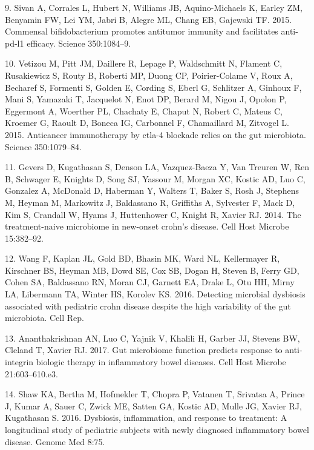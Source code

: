 \documentclass[11pt,]{article}
\begin{document}
\hypertarget{ref-Sivan_cancer_2015}{}
9. Sivan A, Corrales L, Hubert N, Williams JB, Aquino-Michaels K, Earley
ZM, Benyamin FW, Lei YM, Jabri B, Alegre ML, Chang EB, Gajewski TF.
2015. Commensal bifidobacterium promotes antitumor immunity and
facilitates anti-pd-l1 efficacy. Science 350:1084--9.

\hypertarget{ref-Vetizou_cancer_2015}{}
10. Vetizou M, Pitt JM, Daillere R, Lepage P, Waldschmitt N, Flament C,
Rusakiewicz S, Routy B, Roberti MP, Duong CP, Poirier-Colame V, Roux A,
Becharef S, Formenti S, Golden E, Cording S, Eberl G, Schlitzer A,
Ginhoux F, Mani S, Yamazaki T, Jacquelot N, Enot DP, Berard M, Nigou J,
Opolon P, Eggermont A, Woerther PL, Chachaty E, Chaput N, Robert C,
Mateus C, Kroemer G, Raoult D, Boneca IG, Carbonnel F, Chamaillard M,
Zitvogel L. 2015. Anticancer immunotherapy by ctla-4 blockade relies on
the gut microbiota. Science 350:1079--84.

\hypertarget{ref-gevers_pedsCD_2014}{}
11. Gevers D, Kugathasan S, Denson LA, Vazquez-Baeza Y, Van Treuren W,
Ren B, Schwager E, Knights D, Song SJ, Yassour M, Morgan XC, Kostic AD,
Luo C, Gonzalez A, McDonald D, Haberman Y, Walters T, Baker S, Rosh J,
Stephens M, Heyman M, Markowitz J, Baldassano R, Griffiths A, Sylvester
F, Mack D, Kim S, Crandall W, Hyams J, Huttenhower C, Knight R, Xavier
RJ. 2014. The treatment-naive microbiome in new-onset crohn's disease.
Cell Host Microbe 15:382--92.

\hypertarget{ref-wang_pedsCD_2016}{}
12. Wang F, Kaplan JL, Gold BD, Bhasin MK, Ward NL, Kellermayer R,
Kirschner BS, Heyman MB, Dowd SE, Cox SB, Dogan H, Steven B, Ferry GD,
Cohen SA, Baldassano RN, Moran CJ, Garnett EA, Drake L, Otu HH, Mirny
LA, Libermann TA, Winter HS, Korolev KS. 2016. Detecting microbial
dysbiosis associated with pediatric crohn disease despite the high
variability of the gut microbiota. Cell Rep.

\hypertarget{ref-Ananthakrishnan_IBD_2017}{}
13. Ananthakrishnan AN, Luo C, Yajnik V, Khalili H, Garber JJ, Stevens
BW, Cleland T, Xavier RJ. 2017. Gut microbiome function predicts
response to anti-integrin biologic therapy in inflammatory bowel
diseases. Cell Host Microbe 21:603--610.e3.

\hypertarget{ref-Shaw_response_2016}{}
14. Shaw KA, Bertha M, Hofmekler T, Chopra P, Vatanen T, Srivatsa A,
Prince J, Kumar A, Sauer C, Zwick ME, Satten GA, Kostic AD, Mulle JG,
Xavier RJ, Kugathasan S. 2016. Dysbiosis, inflammation, and response to
treatment: A longitudinal study of pediatric subjects with newly
diagnosed inflammatory bowel disease. Genome Med 8:75.
\end{document}
